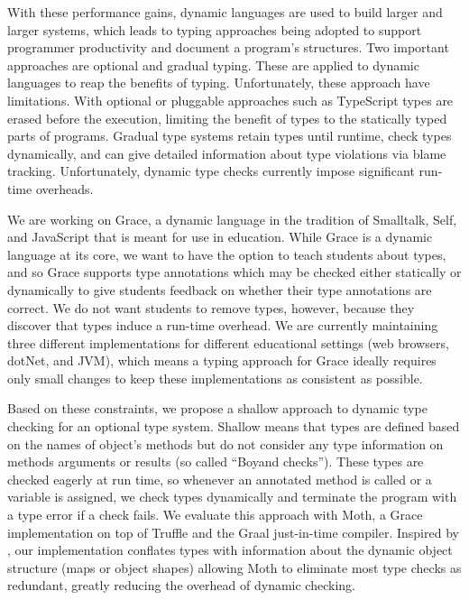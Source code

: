 With these performance gains,
dynamic languages are used to build larger and larger systems,
which leads to typing approaches being adopted
to support programmer productivity and document a program's structures.
Two important approaches are optional\citep{GiladPluggable2004}
and gradual typing\citep{Siek2006,Siek2015}.
These are applied to dynamic languages to reap the benefits of typing.
Unfortunately, these approach have limitations.
With optional or pluggable  approaches such as 
TypeScript \cite{typeScriptECOOP,GiladPluggable2004}
%
types are erased before the execution,
limiting the benefit of types to the statically typed parts of programs.
Gradual type systems retain types until runtime, check types dynamically, and
can give detailed information about type violations via blame 
tracking\citep{Siek2015,blame2009}.
Unfortunately, dynamic type checks currently impose significant run-time overheads\citep{Takikawa2016,Vitousek2017,Muehlboeck2017,Bauman2017,Richards2017,Stulova2016,Greenman2018}.


We are working on Grace\citep{graceOnward12}, a dynamic language in
the tradition of Smalltalk\citep{bluebook}, Self\citep{Self}, and
JavaScript that is meant for use in
education\citep{graceSigcse13}.  While Grace is a dynamic language at
its core, we want to have the option to teach students about types,
and so Grace supports type annotations which may be checked either
statically or dynamically to give students feedback on whether their
type annotations are correct.  We do not want students to remove
types, however, because they discover that types induce a run-time
overhead.  We are currently maintaining three different
implementations for different educational settings (web browsers, dotNet,
and JVM), which means a typing approach for Grace ideally requires
only small changes to keep these implementations as consistent as
possible.

Based on these constraints,
we propose a shallow approach to dynamic type checking
for an optional type system.
Shallow means that types are defined based on the names of object's methods
but do not consider any type information on methods arguments or results (so
called ``Boyand checks''\citep{Boyland2014}).
These types are checked eagerly at run time, so whenever 
an annotated method is called or a variable is assigned,
we check types dynamically and terminate the program with a type error
if a check fails. We evaluate this approach with Moth,
a Grace implementation on top of Truffle
and the Graal just-in-time compiler\citep{Wurthinger2013,Wurthinger:2017:PPE}.
Inspired by \citet{Richards2017,Bauman2017},
our implementation conflates types
with information about the dynamic object structure 
(maps\citep{Self} or object shapes\citep{woss2014object})
allowing Moth to eliminate most type checks as redundant, greatly
reducing the overhead of dynamic checking.

